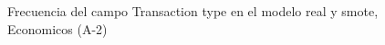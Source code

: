 \begin{figure}[H]
    \centering
    
    \caption{Frecuencia del campo Transaction type en el modelo real y smote, Economicos (A-2)}
    \label{frecuency-Transaction Type-smote-enc}
\end{figure}